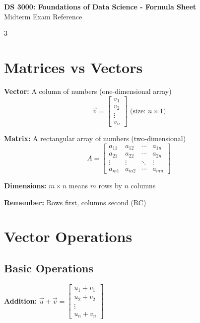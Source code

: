 \documentclass[10pt,landscape]{article}
\begin{document}
\begin{center}
    \Large{\textbf{DS 3000: Foundations of Data Science - Formula Sheet}} \\
    \small{Midterm Exam Reference}
\end{center}

\begin{multicols*}{3}
\setlength{\columnseprule}{0.4pt}

\section*{Matrices vs Vectors}

\textbf{Vector:} A column of numbers (one-dimensional array)
$$\vec{v} = \begin{bmatrix} v_1 \\ v_2 \\ \vdots \\ v_n \end{bmatrix} \text{ (size: } n \times 1)$$

\textbf{Matrix:} A rectangular array of numbers (two-dimensional)
$$A = \begin{bmatrix} a_{11} & a_{12} & \cdots & a_{1n} \\ a_{21} & a_{22} & \cdots & a_{2n} \\ \vdots & \vdots & \ddots & \vdots \\ a_{m1} & a_{m2} & \cdots & a_{mn} \end{bmatrix}$$

\textbf{Dimensions:} $m \times n$ means $m$ rows by $n$ columns

\textbf{Remember:} Rows first, columns second (RC)

\section*{Vector Operations}

\subsection*{Basic Operations}
\textbf{Addition:} $\vec{u} + \vec{v} = \begin{bmatrix} u_1 + v_1 \\ u_2 + v_2 \\ \vdots \\ u_n + v_n \end{bmatrix}$


\end{multicols*}
\end{document}
